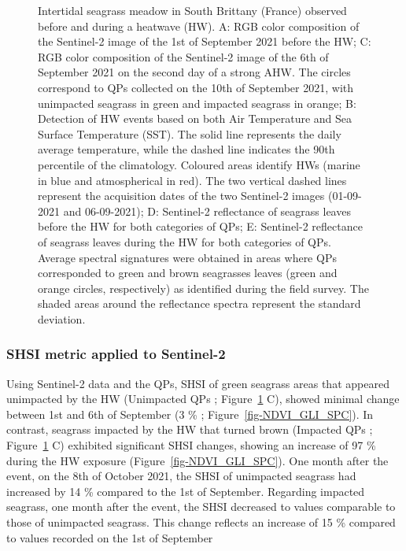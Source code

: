 \documentclass[
  letterpaper,
  11pt,
  english,
  singlespacing,
  headsepline]{MastersDoctoralThesis}
\begin{document}
\begin{spacing}{1.5}
\begin{figure}
{}

\caption{\label{fig-S2_comparison}Intertidal seagrass meadow in South
Brittany (France) observed before and during a heatwave (HW). A: RGB
color composition of the Sentinel-2 image of the 1st of September 2021
before the HW; C: RGB color composition of the Sentinel-2 image of the
6th of September 2021 on the second day of a strong AHW. The circles
correspond to QPs collected on the 10th of September 2021, with
unimpacted seagrass in green and impacted seagrass in orange; B:
Detection of HW events based on both Air Temperature and Sea Surface
Temperature (SST). The solid line represents the daily average
temperature, while the dashed line indicates the 90th percentile of the
climatology. Coloured areas identify HWs (marine in blue and
atmospherical in red). The two vertical dashed lines represent the
acquisition dates of the two Sentinel-2 images (01-09-2021 and
06-09-2021); D: Sentinel-2 reflectance of seagrass leaves before the HW
for both categories of QPs; E: Sentinel-2 reflectance of seagrass leaves
during the HW for both categories of QPs. Average spectral signatures
were obtained in areas where QPs corresponded to green and brown
seagrasses leaves (green and orange circles, respectively) as identified
during the field survey. The shaded areas around the reflectance spectra
represent the standard deviation.}

\end{figure}%

\subsubsection{SHSI metric applied to
Sentinel-2}\label{shsi-metric-applied-to-sentinel-2}

Using Sentinel-2 data and the QPs, SHSI of green seagrass areas that
appeared unimpacted by the HW (Unimpacted QPs ;
Figure~\ref{fig-S2_comparison} C), showed minimal change between 1st and
6th of September (3 \% ; Figure~\ref{fig-NDVI_GLI_SPC}). In contrast,
seagrass impacted by the HW that turned brown (Impacted QPs ;
Figure~\ref{fig-S2_comparison} C) exhibited significant SHSI changes,
showing an increase of 97 \% during the HW exposure
(Figure~\ref{fig-NDVI_GLI_SPC}). One month after the event, on the 8th
of October 2021, the SHSI of unimpacted seagrass had increased by 14 \%
compared to the 1st of September. Regarding impacted seagrass, one month
after the event, the SHSI decreased to values comparable to those of
unimpacted seagrass. This change reflects an increase of 15 \% compared
to values recorded on the 1st of September


\end{spacing}
\end{document}
